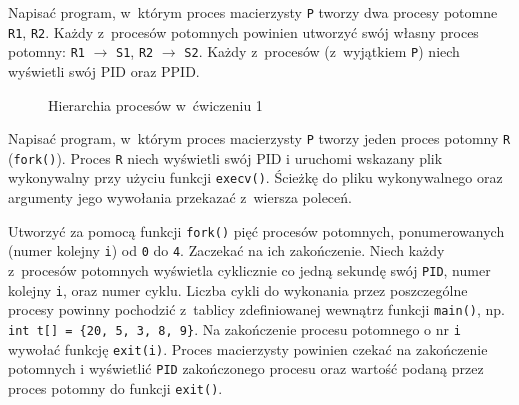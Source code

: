 \begin{myenumerate}
  \item Napisać program, w~którym proces macierzysty \texttt{P} tworzy dwa
    procesy potomne \texttt{R1}, \texttt{R2}. Każdy z~procesów potomnych
    powinien utworzyć swój własny proces potomny: \texttt{R1} $\to$
    \texttt{S1}, \texttt{R2} $\to$ \texttt{S2}. Każdy z~procesów (z~wyjątkiem
    \texttt{P}) niech wyświetli swój PID oraz PPID.
    \begin{figure}[htbp]
      \centering
      \caption{Hierarchia procesów w~ćwiczeniu 1}
      \label{fig:1QZGH}
    \end{figure}
  \item Napisać program, w~którym proces macierzysty \texttt{P} tworzy jeden
    proces potomny \texttt{R} (\texttt{fork()}). Proces \texttt{R} niech
    wyświetli swój PID i uruchomi wskazany plik wykonywalny przy użyciu funkcji
    \texttt{execv()}. Ścieżkę do pliku wykonywalnego oraz argumenty jego
    wywołania przekazać z~wiersza poleceń.
  \item Utworzyć za pomocą funkcji \texttt{fork()} pięć procesów potomnych,
    ponumerowanych (numer kolejny \texttt{i}) od \texttt{0} do \texttt{4}.
    Zaczekać na ich zakończenie. Niech każdy z~procesów potomnych wyświetla
    cyklicznie co jedną sekundę swój \texttt{PID}, numer kolejny \texttt{i},
    oraz numer cyklu. Liczba cykli do wykonania przez poszczególne procesy
    powinny pochodzić z~tablicy zdefiniowanej wewnątrz funkcji \texttt{main()},
    np. \texttt{int t[] = \{20, 5, 3, 8, 9\}}. Na zakończenie procesu potomnego
    o nr \texttt{i} wywołać funkcję \texttt{exit(i)}. Proces macierzysty
    powinien czekać na zakończenie potomnych i wyświetlić \texttt{PID}
    zakończonego procesu oraz wartość podaną przez proces potomny do funkcji
    \texttt{exit()}.
    \begin{figure}[htbp]
      \centering
\end{figure}
\end{myenumerate}
